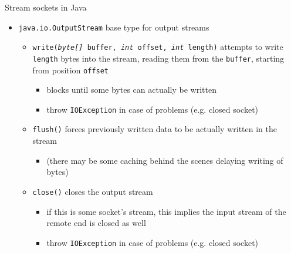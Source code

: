 \documentclass{beamer}\mode<presentation>{\usetheme{AMSBolognaFC}}
\begin{document}
\begin{frame}[c, allowframebreaks]{Stream sockets in Java}
\begin{itemize}
        \item \texttt{java.io.\alert{OutputStream}} base type for output streams 
        \begin{itemize}
            \item \alert{\texttt{write(\textit{byte[]} buffer, \textit{int} offset, \textit{int} length)}} attempts to write \texttt{length} bytes into the stream, reading them from the \texttt{buffer}, starting from position \texttt{offset}
            \begin{itemize}
                \item blocks until some bytes can actually be written
                \item throw \texttt{IOException} in case of problems (e.g. closed socket)
            \end{itemize}
            \item \alert{\texttt{flush()}} forces previously written data to be actually written in the stream
            \begin{itemize}
                \item (there may be some caching behind the scenes delaying writing of bytes)
            \end{itemize}
            \item \alert{\texttt{close()}} closes the output stream
            \begin{itemize}
                \item if this is some socket's stream, this implies the input stream of the remote end is closed as well
                \item throw \texttt{IOException} in case of problems (e.g. closed socket)
            \end{itemize}
        \end{itemize}

    \end{itemize}

\end{frame}
\end{document}
